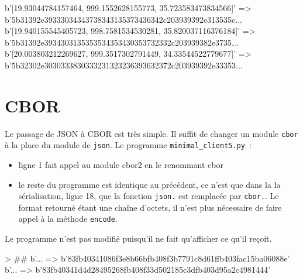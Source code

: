 \begin{termc}[backgroundcolor=\color{palerod}, language=json, basicstyle=\tiny, escapechar=@]
b'[19.93044784157464, 999.1552628155773, 35.723583473834566]' => b'5b31392e39333034343738343135373436342c203939392e313535c...
b'[19.940155545405723, 998.7581534530281, 35.820037116376184]' => b'5b31392e3934303135353534353430353732332c203939382e3735...
b'[20.003803212269627, 999.3517302791449, 34.33544522779677]' => b'5b32302e3030333830333231323236393632372c203939392e33353...
\end{termc}

\section{CBOR}

\begin{figure}
\end{figure}

Le passage de JSON à CBOR est très simple. Il suffit de changer un module \texttt{cbor} à la place du module de \texttt{json}. Le programme \texttt{minimal\_client5.py}~:
\begin{itemize}
    \item ligne 1 fait appel au module cbor2 en le renommant cbor
    \item le reste du programme est identique au précédent, ce n'est que dans la la sérialisation, ligne 18, que la fonction \texttt{json.} est remplacée par \texttt{cbor.}. Le format retourné étant une chaîne d'octets, il n'est plus nécessaire de faire appel à la méthode \texttt{encode}.
\end{itemize}


     \vspace{1em}


Le programme  n'est pas modifié puisqu'il ne fait qu'afficher ce qu'il reçoit. 







\begin{termc}[backgroundcolor=\color{palerod}, language=json, basicstyle=\small, escapechar=#]
> ##
b'... => b'83fb40341086f3e8b66bfb408f3b7791c8d61ffb403fac15ba06088e'
b'... => b'83fb40341d4d28495268fb408f33d502185c3dfb403d95a2c4981444'
\end{termc}


